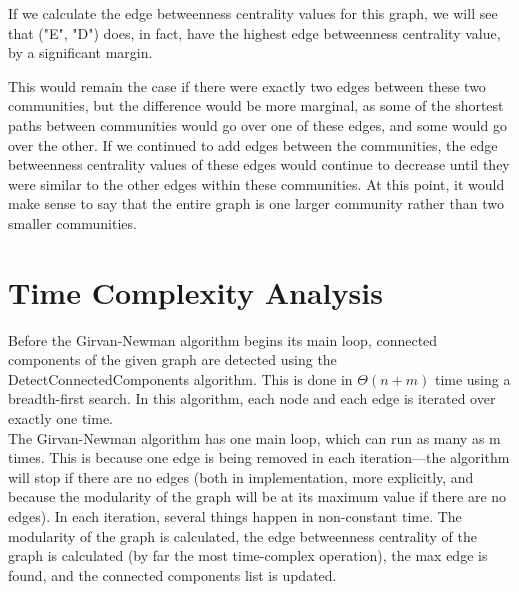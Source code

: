 \documentclass{article}
\begin{document}
If we calculate the edge betweenness centrality values for this graph, we will see that ("E", "D") does, in fact, have the highest edge betweenness centrality value, by a significant margin.

\begin{center}
\end{center}

This would remain the case if there were exactly two edges between these two communities, but the difference would be more marginal, as some of the shortest paths between communities would go over one of these edges, and some would go over the other.  If we continued to add edges between the communities, the edge betweenness centrality values of these edges would continue to decrease until they were similar to the other edges within these communities.  At this point, it would make sense to say that the entire graph is one larger community rather than two smaller communities.

\section{Time Complexity Analysis}

Before the Girvan-Newman algorithm begins its main loop, connected components of the given graph are detected using the DetectConnectedComponents algorithm.  This is done in $\Theta(n + m)$ time using a breadth-first search.  In this algorithm, each node and each edge is iterated over exactly one time. \\

The Girvan-Newman algorithm has one main loop, which can run as many as m times.  This is because one edge is being removed in each iteration---the algorithm will stop if there are no edges (both in implementation, more explicitly, and because the modularity of the graph will be at its maximum value if there are no edges).  In each iteration, several things happen in non-constant time.  The modularity of the graph is calculated, the edge betweenness centrality of the graph is calculated (by far the most time-complex operation), the max edge is found, and the connected components list is updated. \\
\end{document}
